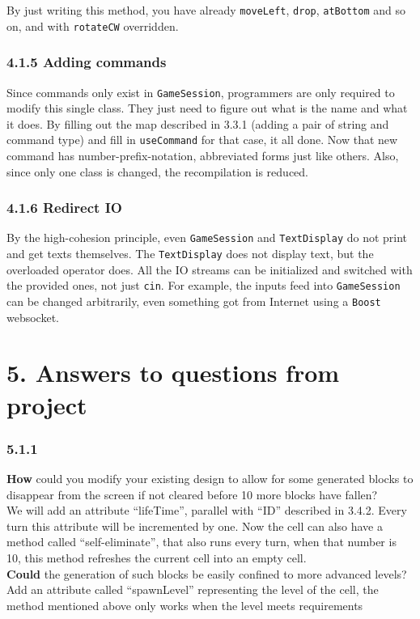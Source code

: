\documentclass[
]{article}
\begin{document}
By just writing this method, you have already \texttt{moveLeft},
\texttt{drop}, \texttt{atBottom} and so on, and with \texttt{rotateCW}
overridden.

\hypertarget{adding-commands}{%
\subsubsection{4.1.5 Adding commands}\label{adding-commands}}

Since commands only exist in \texttt{GameSession}, programmers are only
required to modify this single class. They just need to figure out what
is the name and what it does. By filling out the map described in 3.3.1
(adding a pair of string and command type) and fill in
\texttt{useCommand} for that case, it all done. Now that new command has
number-prefix-notation, abbreviated forms just like others. Also, since
only one class is changed, the recompilation is reduced.

\hypertarget{redirect-io}{%
\subsubsection{4.1.6 Redirect IO}\label{redirect-io}}

By the high-cohesion principle, even \texttt{GameSession} and
\texttt{TextDisplay} do not print and get texts themselves. The
\texttt{TextDisplay} does not display text, but the overloaded operator
does. All the IO streams can be initialized and switched with the
provided ones, not just \texttt{cin}. For example, the inputs feed into
\texttt{GameSession} can be changed arbitrarily, even something got from
Internet using a \texttt{Boost} websocket.

\hypertarget{answers-to-questions-from-project}{%
\section{5. Answers to questions from
project}\label{answers-to-questions-from-project}}

\hypertarget{section}{%
\subsubsection{5.1.1}\label{section}}

\textbf{How} could you modify your existing design to allow for some
generated blocks to disappear from the screen if not cleared before 10
more blocks have fallen?\\
We will add an attribute ``lifeTime'', parallel with ``ID'' described in
3.4.2. Every turn this attribute will be incremented by one. Now the
cell can also have a method called ``self-eliminate'', that also runs
every turn, when that number is 10, this method refreshes the current
cell into an empty cell.\\
\textbf{Could} the generation of such blocks be easily confined to more
advanced levels?\\
Add an attribute called ``spawnLevel'' representing the level of the
cell, the method mentioned above only works when the level meets
requirements
\end{document}
